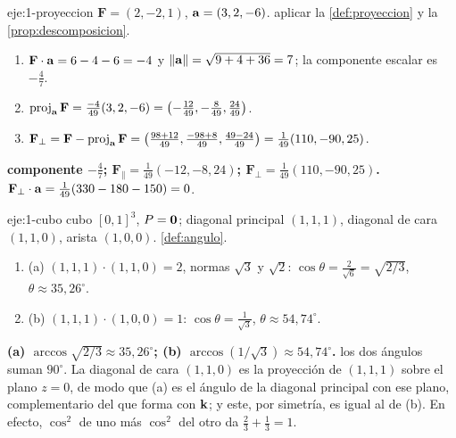 \begin{solucion}{eje:1-proyeccion}
\datos $\mathbf F=(2,-2,1)$, $\mathbf{a}=(3,2,-6)$.
\planteamiento aplicar la \cref{def:proyeccion} y la \cref{prop:descomposicion}.
\pasos
\begin{enumerate}[label=\arabic*.]
  \item $\mathbf F\cdot\mathbf{a}=6-4-6=-4$ y $\lVert\mathbf{a}\rVert=\sqrt{9+4+36}=7$; la componente escalar es $-\frac47$.
  \item $\operatorname{proj}_{\mathbf{a}}\mathbf F=\frac{-4}{49}(3,2,-6)=\bigl(-\frac{12}{49},-\frac{8}{49},\frac{24}{49}\bigr)$.
  \item $\mathbf F_\perp=\mathbf F-\operatorname{proj}_{\mathbf{a}}\mathbf F=\bigl(\frac{98+12}{49},\frac{-98+8}{49},\frac{49-24}{49}\bigr)=\frac{1}{49}(110,-90,25)$.
\end{enumerate}
\resultado \textbf{componente $-\frac47$; $\mathbf F_\parallel=\frac{1}{49}(-12,-8,24)$; $\mathbf F_\perp=\frac{1}{49}(110,-90,25)$.}
\comprobacion $\mathbf F_\perp\cdot\mathbf{a}=\frac{1}{49}(330-180-150)=0$.
\end{solucion}

\begin{solucion}{eje:1-cubo}
\datos cubo $[0,1]^3$, $P=\mathbf{0}$; diagonal principal $(1,1,1)$, diagonal de cara $(1,1,0)$, arista $(1,0,0)$.
\planteamiento \cref{def:angulo}.
\pasos
\begin{enumerate}[label=\arabic*.]
  \item (a) $(1,1,1)\cdot(1,1,0)=2$, normas $\sqrt3$ y $\sqrt2$: $\cos\theta=\frac{2}{\sqrt6}=\sqrt{2/3}$, $\theta\approx35{,}26^\circ$.
  \item (b) $(1,1,1)\cdot(1,0,0)=1$: $\cos\theta=\frac1{\sqrt3}$, $\theta\approx54{,}74^\circ$.
\end{enumerate}
\resultado \textbf{(a) $\arccos\sqrt{2/3}\approx35{,}26^\circ$; (b) $\arccos(1/\sqrt3)\approx54{,}74^\circ$.}
\comprobacion los dos ángulos suman $90^\circ$. La diagonal de cara $(1,1,0)$ es la proyección de $(1,1,1)$ sobre el plano $z=0$, de modo que (a) es el ángulo de la diagonal principal con ese plano, complementario del que forma con $\mathbf{k}$; y este, por simetría, es igual al de (b). En efecto, $\cos^2$ de uno más $\cos^2$ del otro da $\frac23+\frac13=1$.
\end{solucion}

